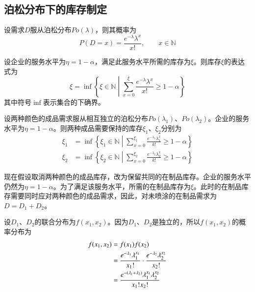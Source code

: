 \subsection{泊松分布下的库存制定}

设需求$D$服从泊松分布$Po(\lambda)$，则其概率为
\[
P(D=x) = \frac{e^{-\lambda}\lambda^x}{x!},\qquad x\in\mathbb{N}
\]

设企业的服务水平为$\eta=1-\alpha$，满足此服务水平所需的库存为$\xi$。则库存$\xi$的表达式为
\begin{equation}
\xi = \inf\left\{\xi\in\mathbb{N}\middle|\sum_{x=0}^{\xi}\frac{e^{-\lambda}\lambda^x}{x!}\geq 1-\alpha\right\}
\end{equation}
其中符号$\inf$表示集合的下确界。

设两种颜色的成品需求服从相互独立的泊松分布$Po(\lambda_1)$、$Po(\lambda_2)$。企业的服务水平为$\eta=1-\alpha$。则两种成品需要保持的库存$\xi_1$、$\xi_2$分别为
\begin{align}
\xi_1 &= \inf\left\{\xi_1\in\mathbb{N}\middle|\sum_{x=0}^{\xi_1}\frac{e^{-\lambda_1}\lambda_1^x}{k!}\geq 1-\alpha\right\} \label{eq:成品库存_泊松1}\\
\xi_2 &= \inf\left\{\xi_2\in\mathbb{N}\middle|\sum_{x=0}^{\xi_2}\frac{e^{-\lambda_2}\lambda_2^x}{k!}\geq 1-\alpha\right\} \label{eq:成品库存_泊松2}
\end{align}

现在假设取消两种颜色的成品库存，改为保留共同的在制品库存。企业的服务水平仍然为$\eta=1-\alpha$。为了满足该服务水平，所需的在制品库存为$\xi$。此时的在制品库存需要同时应对两种颜色的成品需求，因此，对未喷涂的在制品需求为$D=D_1+D_2$。

设$D_1$、$D_2$的联合分布为$f(x_1,x_2)$。因为$D_1$、$D_2$是独立的，所以$f(x_1,x_2)$的概率分布为
\begin{align}
f(x_1,x_2) &= f(x_1)f(x_2) \notag\\
&= \frac{e^{-\lambda_1}\lambda_1^{x_1}}{x_1!} \cdot \frac{e^{-\lambda_2}\lambda_2^{x_2}}{x_2!} \notag\\
&= \frac{e^{-(\lambda_1+\lambda_2)}\lambda_1^{x_1}\lambda_2^{x_2}}{x_1!x_2!}
\label{eq:联合分布_泊松}
\end{align}

